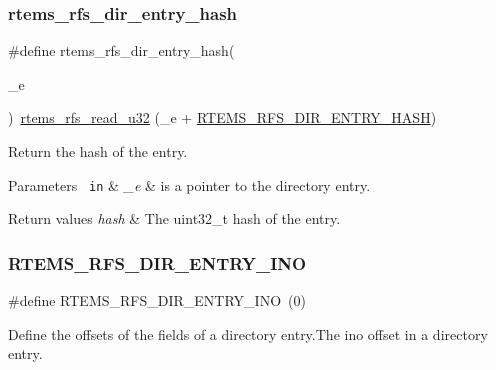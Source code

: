 \subsubsection{\texorpdfstring{rtems\_rfs\_dir\_entry\_hash}{rtems\_rfs\_dir\_entry\_hash}}
{\footnotesize\ttfamily \#define rtems\+\_\+rfs\+\_\+dir\+\_\+entry\+\_\+hash(\begin{DoxyParamCaption}\item[{}]{\+\_\+e }\end{DoxyParamCaption})~\mbox{\hyperlink{rtems-rfs-data_8h_ae061f1784ebeef490293e0080740041a}{rtems\+\_\+rfs\+\_\+read\+\_\+u32}} (\+\_\+e + \mbox{\hyperlink{rtems-rfs-dir_8h_a63fb1e0d701229800ef9f1206d8ac295}{R\+T\+E\+M\+S\+\_\+\+R\+F\+S\+\_\+\+D\+I\+R\+\_\+\+E\+N\+T\+R\+Y\+\_\+\+H\+A\+SH}})}

Return the hash of the entry.


\begin{DoxyParams}[1]{Parameters}
\mbox{\texttt{ in}}  & {\em \+\_\+e} & is a pointer to the directory entry.\\
\hline
\end{DoxyParams}

\begin{DoxyRetVals}{Return values}
{\em hash} & The uint32\+\_\+t hash of the entry. \\
\hline
\end{DoxyRetVals}
\mbox{\label{rtems-rfs-dir_8h_a0b52d37896f9be61b9946bc726aecd4d}} 
\subsubsection{\texorpdfstring{RTEMS\_RFS\_DIR\_ENTRY\_INO}{RTEMS\_RFS\_DIR\_ENTRY\_INO}}
{\footnotesize\ttfamily \#define R\+T\+E\+M\+S\+\_\+\+R\+F\+S\+\_\+\+D\+I\+R\+\_\+\+E\+N\+T\+R\+Y\+\_\+\+I\+NO~(0)}

Define the offsets of the fields of a directory entry.\+The ino offset in a directory entry. \mbox{\label{rtems-rfs-dir_8h_a0de1a6950065a7f9d60e67991bebcd9e}} 
